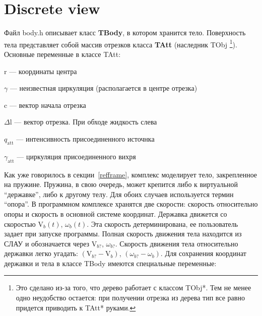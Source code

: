 \documentclass[14pt]{extreport}
\newcommand{\br}[1]{\boldsymbol{\mathrm{#1}}}
\renewcommand{\vec}[1]{\br{#1}}
\newcommand{\att}{\text{att}}
\newenvironment{packed_itemize}{
\begin{itemize}
  \setlength{\itemsep}{1pt}
  \setlength{\parskip}{0pt}
  \setlength{\parsep}{0pt}
}{\end{itemize}}
\begin{document}
\section{Discrete view}
\label{tbody}

Файл body.h описывает класс \textbf{TBody}, в котором хранится тело.
Поверхность тела представляет собой массив отрезков класса \textbf{TAtt} (наследник TObj
\footnote{Это сделано из-за того, что дерево работает с классом TObj*. Тем не менее одно неудобство остается: при получении отрезка из дерева тип все равно придется приводить к TAtt* руками.}).\\

Основные переменные в классе TAtt:
\begin{packed_itemize}
\item $\vec r$ --- координаты центра
\item $\gamma$ --- неизвестная циркуляция (располагается в центре отрезка)
\item $\vec c$ --- вектор начала отрезка
\item $\Delta \vec l$ --- вектор отрезка. При обходе жидкость слева
\item $q_\att$ --- интенсивность присоединенного источнка
\item $\gamma_\att$ --- циркуляция присоединенного вихря
\end{packed_itemize}

Как уже говорилось в секции~\ref{refframe}, комплекс моделирует тело, закрепленное на пружине. Пружина, в свою очередь, может крепится либо к виртуальной ``державке'', либо к другому телу. Для обоих случаев используется термин ``опора''.
В программном комплексе хранятся две скорости: скорость относительно опоры и скорость в основной системе координат. Державка движется со скоростью $\vec V_b(t)$, $\omega_b(t)$. Эта скорость детерминирована, ее пользователь задает при запуске программы. Полная скорость движения тела находится из СЛАУ и обозначается через $\vec V_{b?}$, $\omega_{b?}$. Скорость движения тела относительно державки легко угадать: $(\vec V_{b?} - \vec V_b)$, $(\omega_{b?} - \omega_b)$. Для сохранения координат державки и тела в классе TBody имеются специальные переменные: 
\end{document}
